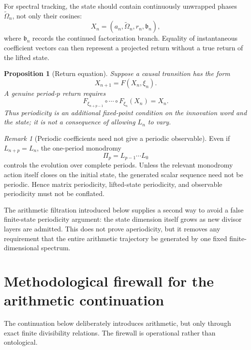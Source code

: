 \documentclass[11pt]{amsart}
\numberwithin{equation}{section}
\theoremstyle{plain}
\newtheorem{proposition}[theorem]{Proposition}
\theoremstyle{definition}
\theoremstyle{remark}
\newtheorem{remark}[theorem]{Remark}
\begin{document}
For spectral tracking, the state should contain continuously unwrapped phases
$\widetilde\Omega_n$, not only their cosines:
\begin{equation}
X_n=
\left(
a_n,\widetilde\Omega_n,r_n,\mathfrak b_n
\right),
\label{eq:lifted_state}
\end{equation}
where $\mathfrak b_n$ records the continued factorization branch.  Equality of instantaneous
coefficient vectors can then represent a projected return without a true return of the lifted
state.

\begin{proposition}[Return equation]
\label{prop:return_equation}
Suppose a causal transition has the form
\[
X_{n+1}=F(X_n,\xi_n).
\]
A genuine period-$p$ return requires
\begin{equation}
F_{\xi_{n+p-1}}\circ\cdots\circ F_{\xi_n}(X_n)=X_n.
\label{eq:p_step_return}
\end{equation}
Thus periodicity is an additional fixed-point condition on the innovation word and the state; it
is not a consequence of allowing $L_n$ to vary.
\end{proposition}

\begin{remark}[Periodic coefficients need not give a periodic observable]
\label{rem:periodic_coeff_not_signal}
Even if $L_{n+p}=L_n$, the one-period monodromy
\[
\Pi_p=L_{p-1}\cdots L_0
\]
controls the evolution over complete periods.  Unless the relevant monodromy action itself closes
on the initial state, the generated scalar sequence need not be periodic.  Hence matrix
periodicity, lifted-state periodicity, and observable periodicity must not be conflated.
\end{remark}

The arithmetic filtration introduced below supplies a second way to avoid a false finite-state
periodicity argument: the state dimension itself grows as new divisor layers are admitted.  This
does not prove aperiodicity, but it removes any requirement that the entire arithmetic trajectory
be generated by one fixed finite-dimensional spectrum.


\section{Methodological firewall for the arithmetic continuation}
\label{sec:arithmetic_firewall}

The continuation below deliberately introduces arithmetic, but only through exact finite
divisibility relations.  The firewall is operational rather than ontological.
\end{document}
